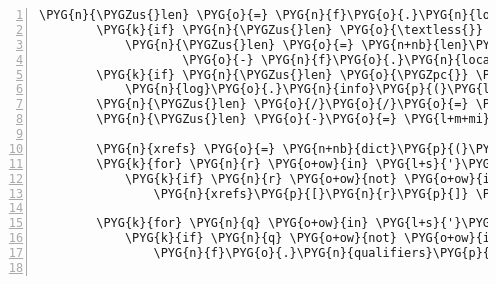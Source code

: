 \begin{Verbatim}[commandchars=\\\{\},numbers=left,firstnumber=1,stepnumber=5]
        \PYG{n}{\PYGZus{}len} \PYG{o}{=} \PYG{n}{f}\PYG{o}{.}\PYG{n}{location}\PYG{o}{.}\PYG{n}{end}\PYG{o}{.}\PYG{n}{position} \PYG{o}{-} \PYG{n}{f}\PYG{o}{.}\PYG{n}{location}\PYG{o}{.}\PYG{n}{start}\PYG{o}{.}\PYG{n}{position}
        \PYG{k}{if} \PYG{n}{\PYGZus{}len} \PYG{o}{\textless{}} \PYG{l+m+mi}{0}\PYG{p}{:}
            \PYG{n}{\PYGZus{}len} \PYG{o}{=} \PYG{n+nb}{len}\PYG{p}{(}\PYG{n}{seq}\PYG{o}{.}\PYG{n}{seq}\PYG{p}{)} \PYGZbs{}
                    \PYG{o}{-} \PYG{n}{f}\PYG{o}{.}\PYG{n}{location}\PYG{o}{.}\PYG{n}{start}\PYG{o}{.}\PYG{n}{position} \PYG{o}{+} \PYG{n}{f}\PYG{o}{.}\PYG{n}{location}\PYG{o}{.}\PYG{n}{end}\PYG{o}{.}\PYG{n}{position}
        \PYG{k}{if} \PYG{n}{\PYGZus{}len} \PYG{o}{\PYGZpc{}} \PYG{l+m+mi}{3}\PYG{p}{:}
            \PYG{n}{log}\PYG{o}{.}\PYG{n}{info}\PYG{p}{(}\PYG{l+s}{"}\PYG{l+s}{implausible feature length (}\PYG{l+s+si}{\PYGZpc{}d}\PYG{l+s}{) in }\PYG{l+s}{'}\PYG{l+s+si}{\PYGZpc{}s}\PYG{l+s}{'}\PYG{l+s}{"} \PYG{o}{\PYGZpc{}} \PYG{p}{(}\PYG{n}{\PYGZus{}len}\PYG{p}{,} \PYG{n}{f}\PYG{o}{.}\PYG{n}{type}\PYG{p}{)}\PYG{p}{)}
        \PYG{n}{\PYGZus{}len} \PYG{o}{/}\PYG{o}{/}\PYG{o}{=} \PYG{l+m+mi}{3} \PYG{c}{\PYGZsh{} integer division}
        \PYG{n}{\PYGZus{}len} \PYG{o}{-}\PYG{o}{=} \PYG{l+m+mi}{1} \PYG{c}{\PYGZsh{} omit stop codon}

        \PYG{n}{xrefs} \PYG{o}{=} \PYG{n+nb}{dict}\PYG{p}{(}\PYG{n+nb}{map}\PYG{p}{(}\PYG{k}{lambda} \PYG{n}{s}\PYG{p}{:} \PYG{n}{s}\PYG{o}{.}\PYG{n}{split}\PYG{p}{(}\PYG{l+s}{'}\PYG{l+s}{:}\PYG{l+s}{'}\PYG{p}{)}\PYG{p}{,} \PYG{n}{f}\PYG{o}{.}\PYG{n}{qualifiers}\PYG{p}{[}\PYG{l+s}{'}\PYG{l+s}{db\PYGZus{}xref}\PYG{l+s}{'}\PYG{p}{]}\PYG{p}{)}\PYG{p}{)}
        \PYG{k}{for} \PYG{n}{r} \PYG{o+ow}{in} \PYG{l+s}{'}\PYG{l+s}{GI}\PYG{l+s}{'}\PYG{p}{,} \PYG{l+s}{'}\PYG{l+s}{GeneID}\PYG{l+s}{'}\PYG{p}{:}
            \PYG{k}{if} \PYG{n}{r} \PYG{o+ow}{not} \PYG{o+ow}{in} \PYG{n}{xrefs}\PYG{p}{:}
                \PYG{n}{xrefs}\PYG{p}{[}\PYG{n}{r}\PYG{p}{]} \PYG{o}{=} \PYG{l+s}{'}\PYG{l+s}{-}\PYG{l+s}{'}

        \PYG{k}{for} \PYG{n}{q} \PYG{o+ow}{in} \PYG{l+s}{'}\PYG{l+s}{gene}\PYG{l+s}{'}\PYG{p}{,} \PYG{l+s}{'}\PYG{l+s}{product}\PYG{l+s}{'}\PYG{p}{,} \PYG{l+s}{'}\PYG{l+s}{locus\PYGZus{}tag}\PYG{l+s}{'}\PYG{p}{:}
            \PYG{k}{if} \PYG{n}{q} \PYG{o+ow}{not} \PYG{o+ow}{in} \PYG{n}{f}\PYG{o}{.}\PYG{n}{qualifiers}\PYG{p}{:}
                \PYG{n}{f}\PYG{o}{.}\PYG{n}{qualifiers}\PYG{p}{[}\PYG{n}{q}\PYG{p}{]} \PYG{o}{=} \PYG{l+s}{'}\PYG{l+s}{-}\PYG{l+s}{'}


\end{Verbatim}

